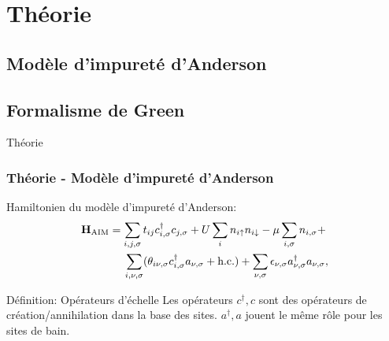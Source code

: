 
\section{Théorie}

\subsection{Modèle d'impureté d'Anderson}

\subsection{Formalisme de Green}

\begin{frame}
    \vfill
    \begin{center}
        \large
        Théorie
    \end{center}
    \vfill
\end{frame}

\begin{frame}
    \frametitle{Théorie - Modèle d'impureté d'Anderson}
    Hamiltonien du modèle d'impureté d'Anderson\footnotemark:
    \begin{align}
        \vb{H}_{\text{AIM}} &= \sum_{i,j,\sigma}t_{ij}c_{i,\sigma}^\dagger c_{j,\sigma} + U\sum_in_{i\uparrow}n_{i\downarrow} - \mu\sum_{i,\sigma}n_{i,\sigma} + \nonumber\\
            &\hspace{0.45cm}\sum_{i,\nu,\sigma}(\theta_{i\nu,\sigma}c_{i,\sigma}^\dagger a_{\nu,\sigma} + \text{h.c.}) + \sum_{\nu,\sigma}\epsilon_{\nu,\sigma}a^\dagger_{\nu,\sigma}a_{\nu,\sigma},
        \label{eq: H_AIM}
    \end{align}
    \pause
    \begin{defblock}{Définition: Opérateurs d'échelle}
        Les opérateurs $c^\dagger, c$ sont des opérateurs de création/annihilation dans la base des
        sites. $a^\dagger, a$ jouent le même rôle pour les sites de bain.
    \end{defblock}
\end{frame}

